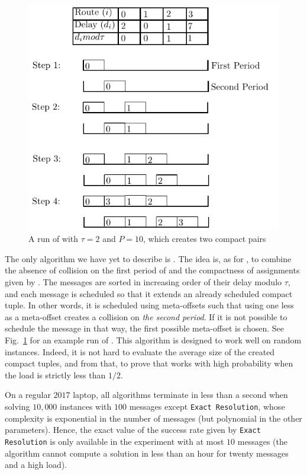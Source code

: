 \documentclass[pdflatex,sn-mathphys,iicol]{sn-jnl}%
\theoremstyle{thmstyleone}%
\theoremstyle{thmstyletwo}%
\theoremstyle{thmstylethree}%
\begin{document}
\begin{figure}[h]
 \begin{center}
\includegraphics[scale=0.8]{compactfit}
\end{center}
\caption{A run of \compactfit with $\tau = 2$ and $P=10$, which creates two compact pairs}
\label{fig:compactfit}
\end{figure}

The only algorithm we have yet to describe is \compactfit. The idea is, as for \compactpair, to combine the absence of collision on the first period of \metaoffset and the compactness of assignments given by \firstfit.
The messages are sorted in increasing order of their delay modulo $\tau$, and each message is scheduled so that it extends an already scheduled compact tuple. 
In other words, it is scheduled using meta-offsets such that using one less as a meta-offset creates a collision on \emph{the second period}. If it is not possible to schedule the message in that way, the first possible meta-offset is chosen. See Fig.~\ref{fig:compactfit} for an example run of \compactfit. This algorithm is designed to work well on random instances. Indeed, it is not hard to evaluate the average size of the created compact tuples, and from that, to prove that \compactfit works with high probability when the load is strictly less than $1/2$.


On a regular $2017$ laptop, all algorithms terminate in less than a second when solving $10,000$ instances with $100$ messages except \texttt{Exact Resolution}, whose complexity is exponential in the number of messages (but polynomial in the other parameters). Hence, the exact value of the success rate given by \texttt{Exact Resolution} is only available in the experiment with at most $10$ messages (the algorithm cannot compute a solution in less than an hour for twenty messages and a high load). 
\end{document}
